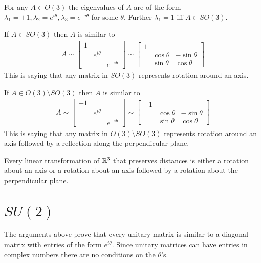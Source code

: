 \begin{proposition}
	For any $A \in O(3)$ the eigenvalues of $A$ are of the form $\lambda_1 = \pm 1 , \lambda_2 = e^{i \theta}, \lambda_3 = e^{-i \theta}$ for some $\theta$. Further $\lambda_1 = 1$ iff $A \in SO(3)$.
\end{proposition}

If $A \in SO(3)$ then $A$ is similar to
\begin{align}
	\label{eq:O3Type1}
	A \sim \begin{bmatrix} 1 &   &   \\ & e^{i \theta} & \\ & & e^{-i\theta} \end{bmatrix} \sim  \begin{bmatrix} 1 &   &   \\ &\cos \theta & -\sin \theta \\ &\sin \theta & \cos \theta \end{bmatrix}
\end{align}
This is saying that any matrix in $SO(3)$ represents rotation around an axis.

If $A \in O(3) \setminus SO(3)$ then $A$ is similar to
\begin{align}
	\label{eq:O3Type2}
	A \sim \begin{bmatrix} -1 &   &   \\ & e^{i \theta} & \\ & & e^{-i\theta} \end{bmatrix} \sim  \begin{bmatrix} -1 &   &   \\ &\cos \theta & -\sin \theta \\ &\sin \theta & \cos \theta \end{bmatrix}
\end{align}
This is saying that any matrix in $O(3) \setminus SO(3)$ represents rotation around an axis followed by a reflection along the perpendicular plane.

\begin{proposition}
	Every linear transformation of $\mathbb{R}^3$ that preserves distances is either a rotation about an axis or a rotation about an axis followed by a rotation about the perpendicular plane.
\end{proposition}





\iffalse
\section{$SU(2)$}
The arguments above prove that every unitary matrix is similar to a diagonal matrix with entries of the form $e^{i\theta}$. Since unitary matrices can have entries in complex numbers there are no conditions on the $\theta$'s.

